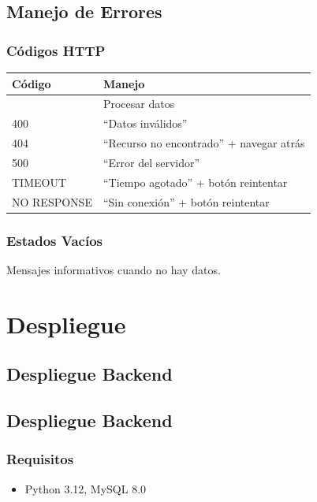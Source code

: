 \documentclass[
  spanish,
  11pt,
  letterpaper,
]{book}
\providecommand{\tightlist}{%
  \setlength{\itemsep}{0pt}\setlength{\parskip}{0pt}}
\begin{document}
\chapter{Manejo de Errores}\label{manejo-de-errores-2}

\section{Códigos HTTP}\label{cuxf3digos-http}

\begin{longtable}[]{@{}ll@{}}
\toprule\noalign{}
Código & Manejo \\
\midrule\noalign{}
\endhead
\bottomrule\noalign{}
\endlastfoot
200 & Procesar datos \\
400 & ``Datos inválidos'' \\
404 & ``Recurso no encontrado'' + navegar atrás \\
500 & ``Error del servidor'' \\
TIMEOUT & ``Tiempo agotado'' + botón reintentar \\
NO RESPONSE & ``Sin conexión'' + botón reintentar \\
\end{longtable}

\section{Estados Vacíos}\label{estados-vacuxedos}

Mensajes informativos cuando no hay datos.

\part{Despliegue}

\chapter{Despliegue Backend}\label{despliegue-backend}

\chapter{Despliegue Backend}\label{despliegue-backend-1}

\section{Requisitos}\label{requisitos}

\begin{itemize}
\tightlist
\item
  Python 3.12, MySQL 8.0
\end{itemize}
\end{document}

